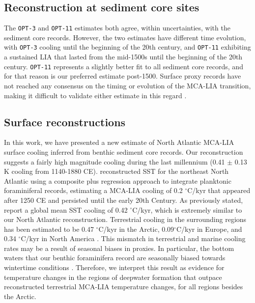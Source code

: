 \documentclass[draft]{agujournal2019}
\begin{document}
\subsection{Reconstruction at sediment core sites}
The \texttt{OPT-3} and \texttt{OPT-11} estimates both agree, within uncertainties, with the sediment core records. However, the two estimates have different time evolution, with \texttt{OPT-3} cooling until the beginning of the 20th century, and \texttt{OPT-11} exhibiting a sustained LIA that lasted from the mid-1500s until the beginning of the 20th century. \texttt{OPT-11} represents a slightly better fit to all sediment core records, and for that reason is our preferred estimate post-1500. Surface proxy records have not reached any consensus on the timing or evolution of the MCA-LIA transition, making it difficult to validate either estimate in this regard \cite[]{MoffaSanchez:Variability}.

\subsection{Surface reconstructions}
In this work, we have presented a new estimate of North Atlantic MCA-LIA surface cooling inferred from benthic sediment core records. Our reconstruction suggests a fairly high magnitude cooling during the last millennium (0.41 $\pm$ 0.13 K cooling from 1140-1880 CE).  reconstructed SST for the northeast North Atlantic using a composite plus regression approach to integrate planktonic foraminiferal records, estimating a MCA-LIA cooling of 0.2 $^{\circ}$C/kyr that appeared after 1250 CE and persisted until the early 20th Century. As previously stated,  report a global mean SST cooling of 0.42 $^{\circ}$C/kyr, which is extremely similar to our North Atlantic reconstruction. Terrestrial cooling in the surrounding regions has been estimated to be 0.47 $^{\circ}$C/kyr in the Arctic, 0.09$^{\circ}$C/kyr in Europe, and 0.34 $^{\circ}$C/kyr in North America \cite[]{Consortium--2013:Continental}. This mismatch in terrestrial and marine cooling rates may be a result of seasonal biases in proxies. In particular, the bottom waters that our benthic foraminifera record are seasonally biased towards wintertime conditions \cite[]{Stommel-1979:Determination, Williams-Marshall-1995:Does}. Therefore, we interpret this result as evidence for temperature changes in the regions of deepwater formation that outpace reconstructed terrestrial MCA-LIA temperature changes, for all regions besides the Arctic.
\end{document}
